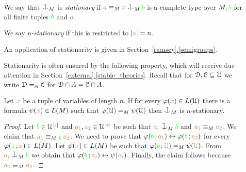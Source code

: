 \documentclass[creche.tex]{subfiles}
\begin{document}
\begin{definition}\label{def_coheir_stationary} We say that $\cnonfork_M$ is \emph{stationary\/} if ${\mr a}\equiv_M{\mr x}\cnonfork_M{\gr b}$ is a complete type over $M,{\color{green} b}$ for all finite tuples ${\color{green} b}$ and ${\color{brown} a}$.

We say \emph{$n$-stationary\/} if this is restricted to $|{\color{brown} a}|=n$.\QED
\end{definition}
%
An application of stationarity is given in Section~\hyperref[stable_theories]{\ref*{ramsey}.\ref*{semigroups}}.

Stationarity is often ensured by the following property, which will receive due attention in Section~\hyperref[stable_theories]{\ref*{external}.\ref*{stable_theories}}. Recall that for $\EuScript D,\EuScript C\subseteq\EuScript U$ we write $\EuScript D=_A\EuScript C$ for $\EuScript D\cap A=\EuScript C\cap A$.

\begin{proposition}
Let ${\color{brown} x}$ be a tuple of variables of length $n$.
If for every $\varphi({\color{brown} x})\in L(\EuScript U)$ there is a formula $\psi({\color{brown} x})\in L(M)$ such that $\varphi(\EuScript U)=_M\psi(\EuScript U)$ then $\cnonfork_M$ is $n$-stationary.
\end{proposition}

\begin{proof}
Let  ${\color{green} b}\in\EuScript U^{|{\color{green} z}|}$ and ${\color{brown} a_1},{\color{brown} a_2}\in\EuScript U^{|{\color{brown} x}|}$ 
be such that ${\mr a_i}\cnonfork_M{\gr b}$ and ${\color{brown} a_1}\equiv_M{\color{brown} a_2}$.
We claim that ${\color{brown} a_1}\equiv_{M,\,{\color{green} b}}{\color{brown} a_2}$.
We need to prove that $\varphi({\color{green} b}\,;{\color{brown} a_1})\leftrightarrow\varphi({\color{green} b}\,;{\color{brown} a_2})$ 
for every  $\varphi({\color{green} z}\,;{\color{brown} x})\in L(M)$.
Let $\psi({\color{brown} x})\in L(M)$ be such that $\varphi({\color{green} b}\,;{\color{brown} \EuScript U})=_M\psi({\color{brown} \EuScript U})$.
From ${\mr a_i}\cnonfork_M{\gr b}$ we obtain that  $\varphi({\color{green} b}\,;{\color{brown} a_i})\leftrightarrow\psi({\color{brown} a_i})$.
Finally, the claim follows because ${\color{brown} a_1}\equiv_M{\color{brown} a_2}$.
\end{proof}



% 
\end{document}
